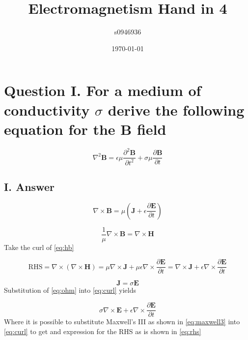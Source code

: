 \documentclass[12pt]{article}
\title{Electromagnetism Hand in 4}
\author{s0946936}
\date{\today}
\begin{document}
\maketitle

\section*{Question I. For a medium of conductivity $\sigma$
derive the following equation for the
B field}

\begin{equation}
\label{eq:identity}
 \nabla^{2}\mathbf{B}=\epsilon\mu \frac{\partial^{2} \mathbf{B}}{\partial t^{2}}+\sigma\mu \frac{\partial \mathbf{B}}{\partial t}
\end{equation}

\subsection*{I. Answer}
\begin{equation}
\label{eq:maxwell4}
\nabla \times \mathbf{B} =\mu\left( \mathbf{J} +\epsilon \frac{\partial \mathbf{E}} {\partial t} \right)
\end{equation}


\begin{equation}
\label{eq:hb}
\frac{1}{\mu}\nabla \times \mathbf{B} =\nabla \times \mathbf{H}
\end{equation}
\noindent
Take the curl of \cref{eq:hb}

\begin{equation}
\label{eq:curl}
\text{RHS} = \nabla \times (\nabla \times \mathbf{H} )= \mu \nabla \times  \mathbf{J} +\mu \epsilon \nabla\times \frac{\partial \mathbf{E}} {\partial t} =
\nabla \times \mathbf{J} +\epsilon \nabla \times \frac{\partial \mathbf{E}} {\partial t} 
\end{equation}

\begin{equation}
\label{eq:ohm}
\mathbf{J}=\sigma\mathbf{E}
\end{equation}
\noindent
Substitution of \cref{eq:ohm} into \cref{eq:curl} yields 


\begin{equation}
\label{eq:curlohm}
 \sigma\nabla \times \mathbf{E}+ \epsilon \nabla \times  \frac{\partial \mathbf{E}} {\partial t} 
\end{equation}
\noindent
Where it is possible to substitute Maxwell's III as shown in \cref{eq:maxwell3} into \cref{eq:curl} to get and expression for the RHS as is shown in \cref{eq:rhs}
\end{document}
